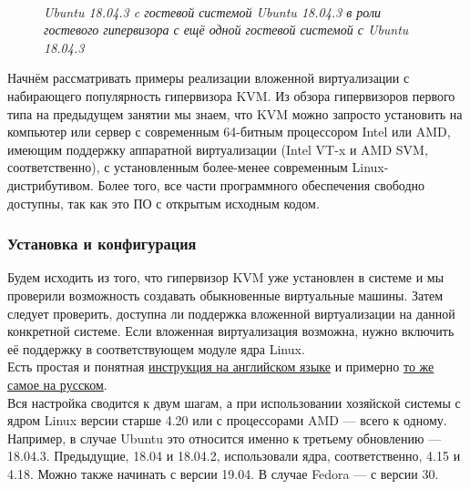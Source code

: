 \documentclass[14pt, a4paper]{article}
\begin{document}
\begin{figure}[h]
    \centering
    \\
    \small\textit{Ubuntu 18.04.3 c гостевой системой Ubuntu 18.04.3 в роли гостевого гипервизора с ещё одной гостевой системой с
    Ubuntu 18.04.3}
    \label{framework} 
\end{figure}

Начнём рассматривать примеры реализации вложенной виртуализации с набирающего популярность
гипервизора KVM. Из обзора гипервизоров первого типа на предыдущем занятии мы знаем, что KVM
можно запросто установить на компьютер или сервер с современным 64-битным процессором Intel
или AMD, имеющим поддержку аппаратной виртуализации (Intel VT-x и AMD SVM, соответственно), с
установленным более-менее современным Linux-дистрибутивом. Более того, все части программного
обеспечения свободно доступны, так как это ПО с открытым исходным кодом.

\subsubsection*{Установка и конфигурация}

Будем исходить из того, что гипервизор KVM уже установлен в системе и мы проверили возможность
создавать обыкновенные виртуальные машины. Затем следует проверить, доступна ли поддержка
вложенной виртуализации на данной конкретной системе. Если вложенная виртуализация возможна,
нужно включить её поддержку в соответствующем модуле ядра Linux.\\

Есть простая и понятная \href{https://docs.fedoraproject.org/en-US/quick-docs/using-nested-virtualization-in-kvm/}{инструкция на английском языке} 
и примерно \href{https://bogachev.biz/2019/05/27/vklyuchenie-nested-virtualizacii-v-kvm/}{то же самое на русском}.\\

Вся настройка сводится к двум шагам, а при использовании хозяйской системы с ядром Linux версии
старше 4.20 или с процессорами AMD — всего к одному. Например, в случае Ubuntu это относится
именно к третьему обновлению — 18.04.3. Предыдущие, 18.04 и 18.04.2, использовали ядра,
соответственно, 4.15 и 4.18. Можно также начинать с версии 19.04. В случае Fedora — с версии 30.
\end{document}
